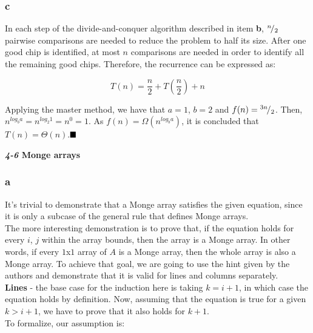 \documentclass[8pt,a4paper]{article}
\begin{document}
\subsubsection*{c}

  In each step of the divide-and-conquer algorithm described in item \textbf{b},
${}^{n}\!/_{2}$ pairwise comparisons are needed to reduce the problem to half
its size. After one good chip is identified, at most $n$ comparisons are needed
in order to identify all the remaining good chips. Therefore, the recurrence can
be expressed as:

\begin{equation*}
  T(n) = \frac{n}{2} + T\left(\frac{n}{2}\right) + n
\end{equation*}

  Applying the master method, we have that $a = 1$, $b = 2$ and $f(n) = {}^{3n}\!/_{2}$.
Then, $n^{log_{b} a} = n^{log_{2} 1} = n^{0} = 1$. As $f(n) = \Omega(n^{log_{b} a})$,
it is concluded that $T(n) = \Theta(n)$.$\qed$

\newpage

\begin{framed}
\textbf{\textit{4-6} Monge arrays}
\end{framed}

\subsubsection*{a}

  It's trivial to demonstrate that a Monge array satisfies the given equation,
since it is only a subcase of the general rule that defines Monge arrays. \\

  The more interesting demonstration is to prove that, if the equation holds for
every $i$, $j$ within the array bounds, then the array is a Monge array. In other words,
if every $1$x$1$ array of $A$ is a Monge array, then the whole array is also a Monge array.
To achieve that goal, we are going to use the hint given by the authors and demonstrate that
it is valid for lines and columns separately. \\

\textbf{Lines} - the base case for the induction here is taking $k = i + 1$, in which case
the equation holds by definition. Now, assuming that the equation is true for a given
$k > i + 1$, we have to prove that it also holds for $k + 1$. \\

  To formalize, our assumption is:
\end{document}

